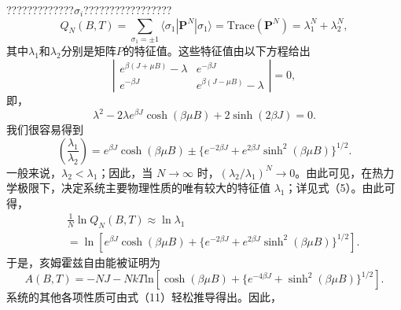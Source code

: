 ?????????????\(\sigma_{i}\)?????????????????
\begin{equation}\tag{13.1.23}\label{eq:13.1.23}
Q _ { N } ( B , T ) = \sum _ { \sigma _ { 1 } = \pm 1 } \langle \sigma _ { 1 } | \boldsymbol { P } ^{N} | \sigma _ { 1 } \rangle = \mathrm { T r a c e } \left( \boldsymbol { P } ^{N} \right) = \lambda _ { 1 } ^{N} + \lambda _ { 2 } ^{N} ,
\end{equation}
其中\(\lambda_{1}\)和\(\lambda_{2}\)分别是矩阵\(P\)的特征值。这些特征值由以下方程给出
\begin{equation}\tag{13.1.24}\label{eq:13.1.24}
\left| \begin{array}{cc} { { e ^{\beta ( J + \mu B )} - \lambda } } & { { e ^{- \beta J} } } \\{ { e ^{- \beta J} } } & { { e ^{\beta ( J - \mu B )} - \lambda } } \end{array} \right| = 0 ,
\end{equation}
即，
\begin{equation}\tag{13.1.25}\label{eq:13.1.25}
\lambda ^{2} - 2 \lambda e ^{\beta J} \cosh ( \beta \mu B ) + 2 \sinh ( 2 \beta J ) = 0 .
\end{equation}
我们很容易得到
\begin{equation}\tag{13.1.26}\label{eq:13.1.26}
\left( \frac { \lambda _ { 1 } } { \lambda _ { 2 } } \right) = e ^{\beta J} \cosh ( \beta \mu B ) \pm \{ e ^{- 2 \beta J} + e ^{2 \beta J} \sinh ^{2} ( \beta \mu B ) \} ^{1 / 2} .
\end{equation}
一般来说，\(\lambda_{2} < \lambda_{1}\)；因此，当 \(N \rightarrow \infty\) 时，\((\lambda_{2}/\lambda_{1})^{N} \rightarrow 0\)。由此可见，在热力学极限下，决定系统主要物理性质的唯有较大的特征值 \(\lambda_{1}\)；详见式（5）。由此可得，
\begin{equation}\tag{13.1.27}\label{eq:13.1.27}
\begin{array}{rlr} & { } & { \frac { 1 } { N } \ln Q _ { N } ( B , T ) \approx \ln \lambda _ { 1 } } \\& { } & { = \ln [ e ^{\beta J} \cosh ( \beta \mu B ) + \{ e ^{- 2 \beta J} + e ^{2 \beta J} \sinh ^{2} ( \beta \mu B ) \} ^{1 / 2} ] . } \end{array}
\end{equation}
于是，亥姆霍兹自由能被证明为
\begin{equation}\tag{13.1.28}\label{eq:13.1.28}
A ( B , T ) = - N J - N k T \mathrm { l n } [ \cosh ( \beta \mu B ) + \{ e ^{- 4 \beta J} + \sinh ^{2} ( \beta \mu B ) \} ^{1 / 2} ] .
\end{equation}
系统的其他各项性质可由式（11）轻松推导得出。因此，
